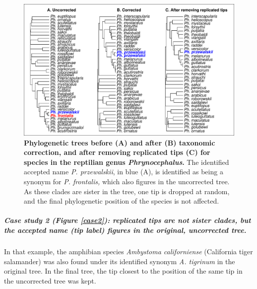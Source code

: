 \documentclass[11pt]{article}
\begin{document}
\begin{figure}[h!]
\centering
\includegraphics[scale=0.8]{figures/Case_studies/Case1}
\caption[Phylogenetic trees before (A) and after (B) taxonomic correction, and after removing replicated tips (C) for species in the reptilian genus \textit{Phrynocephalus}]{\textbf{Phylogenetic trees before (A) and after (B) taxonomic correction, and after removing replicated tips (C) for species in the reptilian genus \textit{Phrynocephalus}.} The identified accepted name \textit{P. przewalskii}, in blue (A), is identified as being a synonym for \textit{P. frontalis,} which also figures in the uncorrected tree. As these clades are sister in the tree, one tip is dropped at random, and the final phylogenetic position of the species is not affected.}
\label{case1}
\end{figure}

\pagebreak
\subparagraph{Case study 2 (Figure \ref{case2}): replicated tips are not sister clades, but the accepted name (tip label) figures in the original, uncorrected tree.} In that example, the amphibian species \textit{Ambystoma californiense} (California tiger salamander) was also found under its identified synonym \textit{A. tigrinum} in the original tree. In the final tree, the tip closest to the position of the same tip in the uncorrected tree was kept.
\end{document}
